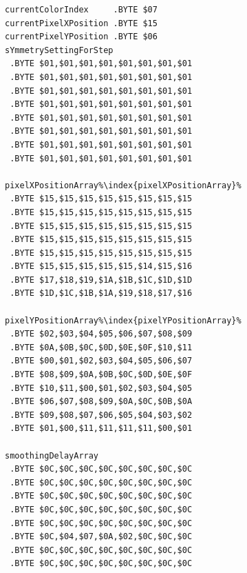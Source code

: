 \begin{minipage}[b]{0.33\linewidth}
\begin{lrbox}{\mybox}
\begin{lstlisting}[basicstyle=\ttfamily\tiny,escapechar=\%]
currentColorIndex     .BYTE $07
currentPixelXPosition .BYTE $15
currentPixelYPosition .BYTE $06
sYmmetrySettingForStep
 .BYTE $01,$01,$01,$01,$01,$01,$01,$01
 .BYTE $01,$01,$01,$01,$01,$01,$01,$01
 .BYTE $01,$01,$01,$01,$01,$01,$01,$01
 .BYTE $01,$01,$01,$01,$01,$01,$01,$01
 .BYTE $01,$01,$01,$01,$01,$01,$01,$01
 .BYTE $01,$01,$01,$01,$01,$01,$01,$01
 .BYTE $01,$01,$01,$01,$01,$01,$01,$01
 .BYTE $01,$01,$01,$01,$01,$01,$01,$01

pixelXPositionArray%\index{pixelXPositionArray}%   
 .BYTE $15,$15,$15,$15,$15,$15,$15,$15
 .BYTE $15,$15,$15,$15,$15,$15,$15,$15
 .BYTE $15,$15,$15,$15,$15,$15,$15,$15
 .BYTE $15,$15,$15,$15,$15,$15,$15,$15
 .BYTE $15,$15,$15,$15,$15,$15,$15,$15
 .BYTE $15,$15,$15,$15,$15,$14,$15,$16
 .BYTE $17,$18,$19,$1A,$1B,$1C,$1D,$1D
 .BYTE $1D,$1C,$1B,$1A,$19,$18,$17,$16

pixelYPositionArray%\index{pixelYPositionArray}%   
 .BYTE $02,$03,$04,$05,$06,$07,$08,$09
 .BYTE $0A,$0B,$0C,$0D,$0E,$0F,$10,$11
 .BYTE $00,$01,$02,$03,$04,$05,$06,$07
 .BYTE $08,$09,$0A,$0B,$0C,$0D,$0E,$0F
 .BYTE $10,$11,$00,$01,$02,$03,$04,$05
 .BYTE $06,$07,$08,$09,$0A,$0C,$0B,$0A
 .BYTE $09,$08,$07,$06,$05,$04,$03,$02
 .BYTE $01,$00,$11,$11,$11,$11,$00,$01

smoothingDelayArray   
 .BYTE $0C,$0C,$0C,$0C,$0C,$0C,$0C,$0C
 .BYTE $0C,$0C,$0C,$0C,$0C,$0C,$0C,$0C
 .BYTE $0C,$0C,$0C,$0C,$0C,$0C,$0C,$0C
 .BYTE $0C,$0C,$0C,$0C,$0C,$0C,$0C,$0C
 .BYTE $0C,$0C,$0C,$0C,$0C,$0C,$0C,$0C
 .BYTE $0C,$04,$07,$0A,$02,$0C,$0C,$0C
 .BYTE $0C,$0C,$0C,$0C,$0C,$0C,$0C,$0C
 .BYTE $0C,$0C,$0C,$0C,$0C,$0C,$0C,$0C
\end{lstlisting}
\end{lrbox}%
\scalebox{0.8}{\usebox{\mybox}}
\end{minipage}
\hspace{0.5cm}
